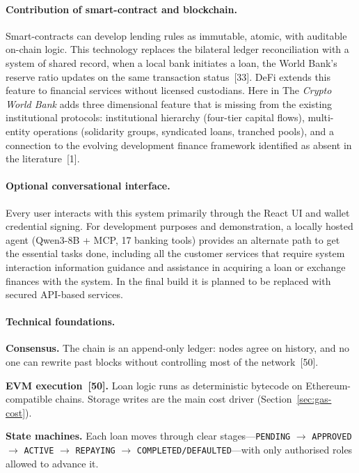 \documentclass[12pt, a4paper]{report}
\begin{document}
\paragraph{Contribution of smart-contract and blockchain.}
Smart-contracts can develop lending rules as immutable, atomic, with auditable on-chain logic. This technology replaces the bilateral ledger reconciliation with a system of shared record, when a local bank initiates a loan, the World Bank's reserve ratio updates on the same transaction status~[33]. DeFi extends this feature to financial services without licensed custodians. Here in The \textit{Crypto World Bank} adds three dimensional feature that is missing from the existing institutional protocols: institutional hierarchy (four-tier capital flows), multi-entity operations (solidarity groups, syndicated loans, tranched pools), and a connection to the evolving development finance framework identified as absent in the literature~[1].

\paragraph{Optional conversational interface.}
Every user interacts with this system primarily through the React UI and wallet credential signing. For development purposes and demonstration, a locally hosted agent (Qwen3-8B + MCP, 17 banking tools) provides an alternate path to get the essential tasks done, including all the customer services that require system interaction information guidance and assistance in acquiring a loan or exchange finances with the system. In the final build it is planned to be replaced with secured API-based services.

\paragraph{Technical foundations.}
\label{sec:blockchain-fundamentals}

\textbf{Consensus.} The chain is an append-only ledger: nodes agree on history, and no one can rewrite past blocks without controlling most of the network~[50].

\textbf{EVM execution~[50].} Loan logic runs as deterministic bytecode on Ethereum-compatible chains. Storage writes are the main cost driver (Section~\ref{sec:gas-cost}).

\textbf{State machines.} Each loan moves through clear stages---\texttt{PENDING} $\to$ \texttt{APPROVED} $\to$ \texttt{ACTIVE} $\to$ \texttt{REPAYING} $\to$ \texttt{COMPLETED/DEFAULTED}---with only authorised roles allowed to advance it.
\end{document}
